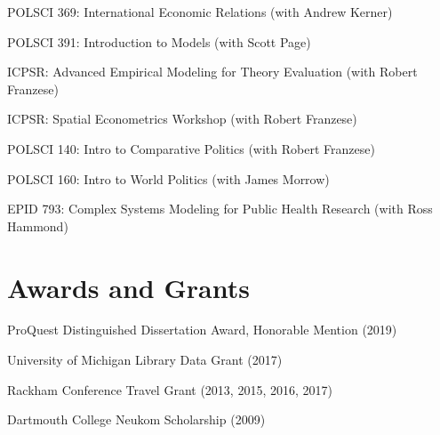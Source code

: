 \documentclass[letterpaper]{article}
\renewenvironment{itemize}{
  \begin{list}{}{
    \setlength{\leftmargin}{1.5em}
  }
}{
  \end{list}
}
\begin{document}
\begin{itemize}
\item POLSCI 369: International Economic Relations (with Andrew Kerner) %
\item POLSCI 391: Introduction to Models (with Scott Page) %
\item ICPSR: Advanced Empirical Modeling for Theory Evaluation (with Robert Franzese) %
\item ICPSR: Spatial Econometrics Workshop (with Robert Franzese) %
\item POLSCI 140: Intro to Comparative Politics (with Robert Franzese) %
\item POLSCI 160: Intro to World Politics (with James Morrow) %
\item EPID 793: Complex Systems Modeling for Public Health Research (with Ross Hammond) %
\end{itemize}

\hrulefill

\section*{Awards and Grants}
\begin{itemize}
\item ProQuest Distinguished Dissertation Award, Honorable Mention (2019)
\item University of Michigan Library Data Grant (2017)
\item Rackham Conference Travel Grant (2013, 2015, 2016, 2017)
\item Dartmouth College Neukom Scholarship (2009)
\end{itemize}
\end{document}
